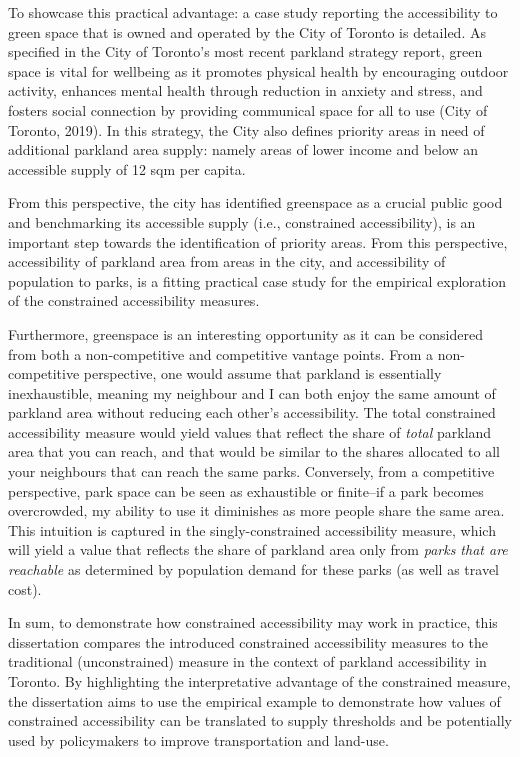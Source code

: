 \documentclass[
11pt, %
oneside, %
english, %
singlespacing, %
]{macthesis} %
\begin{document}
To showcase this practical advantage: a case study reporting the accessibility to green space that is owned and operated by the City of Toronto is detailed. As specified in the City of Toronto's most recent parkland strategy report, green space is vital for wellbeing as it promotes physical health by encouraging outdoor activity, enhances mental health through reduction in anxiety and stress, and fosters social connection by providing communical space for all to use (City of Toronto, 2019). In this strategy, the City also defines priority areas in need of additional parkland area supply: namely areas of lower income and below an accessible supply of 12 sqm per capita.

From this perspective, the city has identified greenspace as a crucial public good and benchmarking its accessible supply (i.e., constrained accessibility), is an important step towards the identification of priority areas. From this perspective, accessibility of parkland area from areas in the city, and accessibility of population to parks, is a fitting practical case study for the empirical exploration of the constrained accessibility measures.

Furthermore, greenspace is an interesting opportunity as it can be considered from both a non-competitive and competitive vantage points. From a non-competitive perspective, one would assume that parkland is essentially inexhaustible, meaning my neighbour and I can both enjoy the same amount of parkland area without reducing each other's accessibility. The total constrained accessibility measure would yield values that reflect the share of \emph{total} parkland area that you can reach, and that would be similar to the shares allocated to all your neighbours that can reach the same parks. Conversely, from a competitive perspective, park space can be seen as exhaustible or finite--if a park becomes overcrowded, my ability to use it diminishes as more people share the same area. This intuition is captured in the singly-constrained accessibility measure, which will yield a value that reflects the share of parkland area only from \emph{parks that are reachable} as determined by population demand for these parks (as well as travel cost).

In sum, to demonstrate how constrained accessibility may work in practice, this dissertation compares the introduced constrained accessibility measures to the traditional (unconstrained) measure in the context of parkland accessibility in Toronto. By highlighting the interpretative advantage of the constrained measure, the dissertation aims to use the empirical example to demonstrate how values of constrained accessibility can be translated to supply thresholds and be potentially used by policymakers to improve transportation and land-use.
\end{document}

